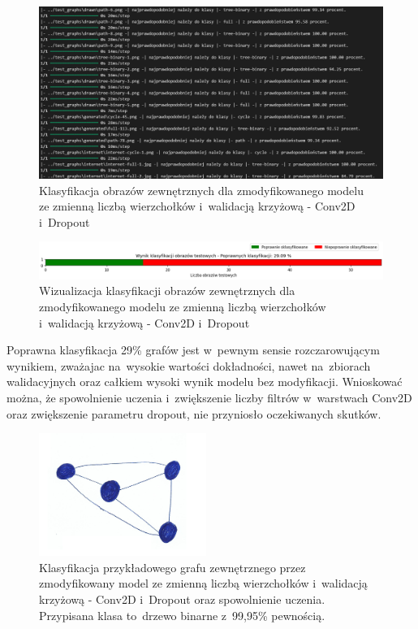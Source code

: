 \begin{figure}[ht]
	\centering
	\includegraphics[width=15.5cm]{resources/tests/images/v4/multiple_edges_crossvalid_1_txt.png}
	\caption{Klasyfikacja obrazów zewnętrznych dla zmodyfikowanego modelu \\
		ze zmienną liczbą wierzchołków i~walidacją krzyżową - Conv2D i~Dropout}
	\label{Fig:tests-csvar-1b}
\end{figure}
\FloatBarrier

\begin{figure}[ht]
	\centering
	\includegraphics[width=15.5cm]{resources/tests/images/v4/multiple_edges_crossvalid_1_bar.png}
	\caption{Wizualizacja klasyfikacji obrazów zewnętrznych dla zmodyfikowanego modelu
		ze zmienną liczbą wierzchołków i~walidacją krzyżową - Conv2D i~Dropout}
	\label{Fig:tests-csvar-1c}
\end{figure}
\FloatBarrier

Poprawna klasyfikacja 29\% grafów jest w~pewnym sensie rozczarowującym wynikiem,
zważajac na~wysokie wartości dokładności, nawet na~zbiorach walidacyjnych
oraz całkiem wysoki wynik modelu bez modyfikacji.
Wnioskować można, że spowolnienie uczenia i~zwiększenie liczby filtrów w~warstwach Conv2D oraz zwiększenie parametru dropout,
nie przyniosło oczekiwanych skutków.

\begin{figure}[ht]
	\centering
	\includegraphics[height=4cm]{../graph_classification/test_graphs/drawn/full-10.png}
	\caption{Klasyfikacja przykładowego grafu zewnętrznego przez
		zmodyfikowany model ze zmienną liczbą wierzchołków i~walidacją krzyżową - Conv2D i~Dropout oraz spowolnienie uczenia.
		Przypisana klasa to~drzewo binarne z~99,95\% pewnością.}
	\label{Fig:tests-cv-1d}
\end{figure}
\FloatBarrier

